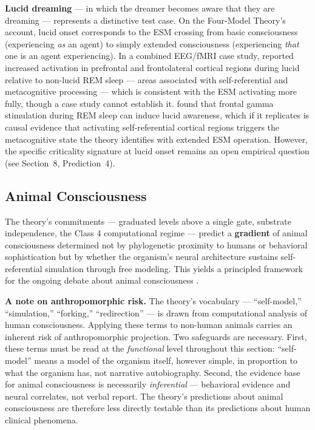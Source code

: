 \documentclass[12pt]{article}
\newcommand{\revstart}{}
\newcommand{\revend}{}
\begin{document}
{\textbf{Lucid dreaming} --- in which the dreamer becomes aware that they are dreaming --- represents a distinctive test case. On the Four-Model Theory's account, lucid onset corresponds to the ESM crossing from basic consciousness (experiencing \emph{as} an agent) to simply extended consciousness (experiencing \emph{that} one is an agent experiencing). In a combined EEG/fMRI case study, \citet{Dresler2012} reported increased activation in prefrontal and frontolateral cortical regions during lucid relative to non-lucid REM sleep --- areas associated with self-referential and metacognitive processing --- which is consistent with the ESM activating more fully, though a case study cannot establish it. \citet{Voss2014} found that frontal gamma stimulation during REM sleep can induce lucid awareness, which if it replicates is causal evidence that activating self-referential cortical regions triggers the metacognitive state the theory identifies with extended ESM operation. However, the specific criticality signature at lucid onset remains an open empirical question (see Section~8, Prediction~4).\revend}


\subsection{Animal Consciousness}


The theory's commitments --- graduated levels above a single gate, substrate independence, the Class 4 computational regime --- predict a \textbf{gradient} of animal consciousness determined not by phylogenetic proximity to humans or behavioral sophistication but by whether the organism's neural architecture sustains self-referential simulation through free modeling. This yields a principled framework for the ongoing debate about animal consciousness \citep{BirchSchnellClayton2020,BarronKlein2016,NYDeclaration2024}.

{\revstart\textbf{A note on anthropomorphic risk.} The theory's vocabulary --- ``self-model,'' ``simulation,'' ``forking,'' ``redirection'' --- is drawn from computational analysis of human consciousness. Applying these terms to non-human animals carries an inherent risk of anthropomorphic projection. Two safeguards are necessary. First, these terms must be read at the \emph{functional} level throughout this section: ``self-model'' means a model of the organism itself, however simple, in proportion to what the organism has, not narrative autobiography. Second, the evidence base for animal consciousness is necessarily \emph{inferential} --- behavioral evidence and neural correlates, not verbal report. The theory's predictions about animal consciousness are therefore less directly testable than its predictions about human clinical phenomena.\revend}
\end{document}
